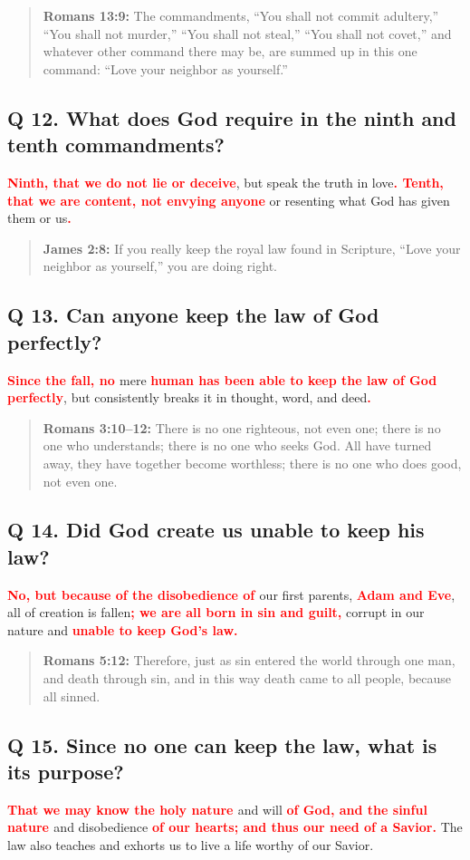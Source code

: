 \documentclass[titlepage]{memoir}
\newcommand\Children[1]{\textbf{\textcolor{red}{#1}}}
\newcommand\Quote[2]{\begin{quote}{\small\textbf{#1:}{ #2}}\end{quote}}
\begin{document}
\Quote{Romans 13:9}{The commandments, ``You shall not commit adultery,'' ``You shall not murder,'' ``You shall not steal,'' ``You shall not covet,'' and whatever other command there may be, are summed up in this one command: ``Love your neighbor as yourself.''}

\subsection{Q 12. What does God require in the ninth and tenth commandments?}
\Children{Ninth, that we do not lie or deceive}, but speak the truth in love\Children{. Tenth, that we are content, not envying anyone} or resenting what God has given them or us\Children{.}

\Quote{James 2:8}{If you really keep the royal law found in Scripture, ``Love your neighbor as yourself,'' you are doing right.}

\subsection{Q 13. Can anyone keep the law of God perfectly?}
\Children{Since the fall, no }mere \Children{human has been able to keep the law of God perfectly}, but consistently breaks it in thought, word, and deed\Children{.}

\Quote{Romans 3:10--12}{There is no one righteous, not even one; there is no one who understands; there is no one who seeks God. All have turned away, they have together become worthless; there is no one who does good, not even one.}

\subsection{Q 14. Did God create us unable to keep his law?}
\Children{No, but because of the disobedience of }our first parents, \Children{Adam and Eve}, all of creation is fallen\Children{; we are all born in sin and guilt,} corrupt in our nature and \Children{ unable to keep God's law.}

\Quote{Romans 5:12}{Therefore, just as sin entered the world through one man, and death through sin, and in this way death came to all people, because all sinned.}

\subsection{Q 15. Since no one can keep the law, what is its purpose?}
\Children{That we may know the holy nature }and will \Children{of God, and the sinful nature }and disobedience \Children{of our hearts; and thus our need of a Savior.} The law also teaches and exhorts us to live a life worthy of our Savior.
\end{document}
